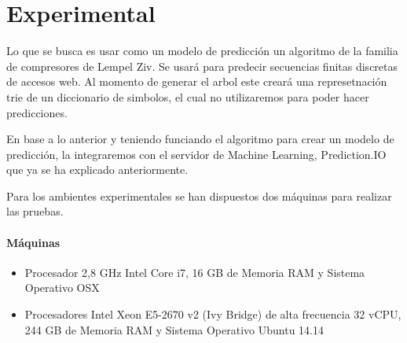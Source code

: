 \chapter[Experimental]{Experimental}
\label{ch:tema}





Lo que se busca es usar como un modelo de predicción un algoritmo de la familia de compresores de Lempel Ziv. Se usará para predecir secuencias finitas discretas de accesos web. Al momento de generar el arbol este creará una represetnación trie de un diccionario de simbolos, el cual no utilizaremos para poder hacer predicciones.

En base a lo anterior y teniendo funciando el algoritmo para crear un modelo de predicción, la integraremos con el servidor de Machine Learning, Prediction.IO que ya se ha explicado anteriormente.




Para los ambientes experimentales se han dispuestos dos máquinas para realizar las pruebas.

\subsubsection{Máquinas}
\begin{itemize}
	\item Procesador 2,8 GHz Intel Core i7, 16 GB de Memoria RAM y Sistema Operativo OSX
	\item Procesadores Intel Xeon E5-2670 v2 (Ivy Bridge) de alta frecuencia 32 vCPU, 244 GB de Memoria RAM y Sistema Operativo Ubuntu 14.14 
\end{itemize}

